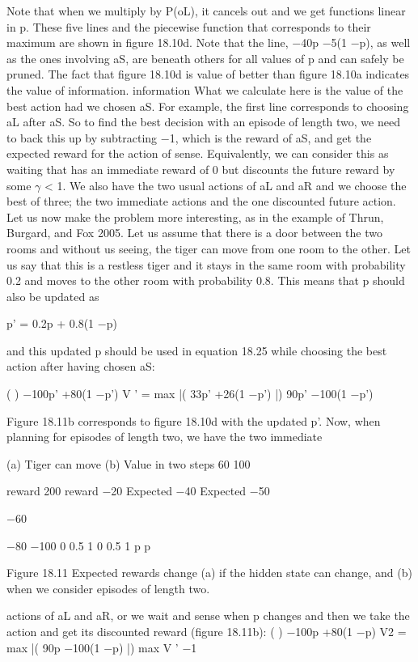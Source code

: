 Note that when we multiply by P(oL), it cancels out and we get functions linear in p. These five lines and the piecewise function that corresponds to their maximum are shown in figure 18.10d. Note that the line, $-$40p $-$5(1 $-$p), as well as the ones involving aS, are beneath others for all values of p and can safely be pruned. The fact that figure 18.10d is value of better than figure 18.10a indicates the value of information. information What we calculate here is the value of the best action had we chosen aS. For example, the first line corresponds to choosing aL after aS. So to find the best decision with an episode of length two, we need to back this up by subtracting $-$1, which is the reward of aS, and get the expected reward for the action of sense. Equivalently, we can consider this as waiting that has an immediate reward of 0 but discounts the future reward by some $\gamma$ < 1. We also have the two usual actions of aL and aR and we choose the best of three; the two immediate actions and the one discounted future action. Let us now make the problem more interesting, as in the example of Thrun, Burgard, and Fox 2005. Let us assume that there is a door between the two rooms and without us seeing, the tiger can move from one room to the other. Let us say that this is a restless tiger and it stays in the same room with probability 0.2 and moves to the other room with probability 0.8. This means that p should also be updated as

p' = 0.2p + 0.8(1 $-$p)

and this updated p should be used in equation 18.25 while choosing the best action after having chosen aS:

( ) $-$100p' +80(1 $-$p') V ' = max |( 33p' +26(1 $-$p') |) 90p' $-$100(1 $-$p')

Figure 18.11b corresponds to figure 18.10d with the updated p'. Now, when planning for episodes of length two, we have the two immediate

(a) Tiger can move (b) Value in two steps 60 100

reward 200 reward $-$20 Expected $-$40 Expected $-$50

$-$60

$-$80 $-$100 0 0.5 1 0 0.5 1 p p

Figure 18.11 Expected rewards change (a) if the hidden state can change, and (b) when we consider episodes of length two.

actions of aL and aR, or we wait and sense when p changes and then we take the action and get its discounted reward (figure 18.11b): ( ) $-$100p +80(1 $-$p) V2 = max |( 90p $-$100(1 $-$p) |) max V ' $-$1

